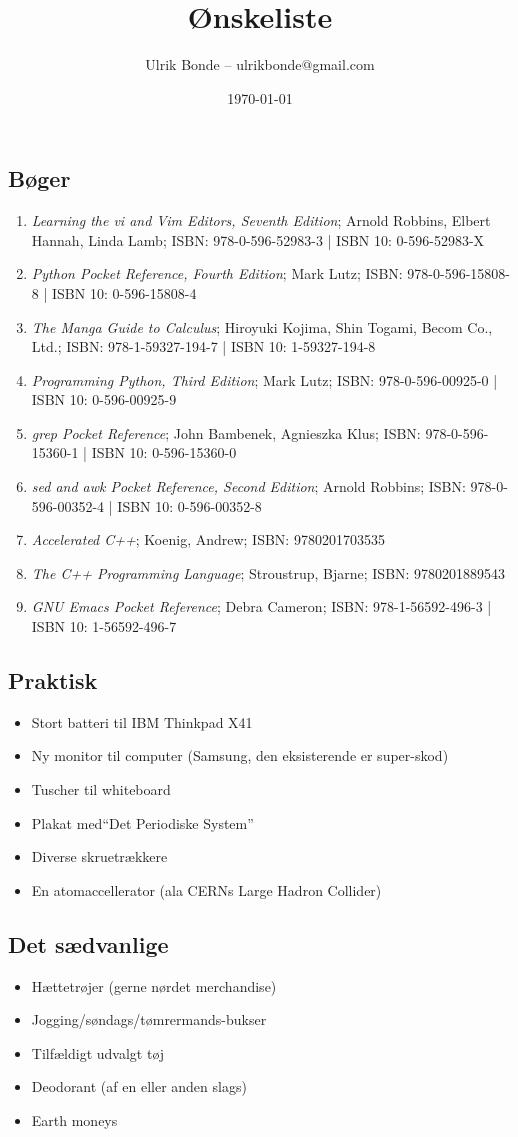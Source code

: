 \documentclass[a4paper, danish, 10pt, final]{article}
\title{Ønskeliste}
\author{Ulrik Bonde -- ulrikbonde@gmail.com}
\date{\today}
\begin{document}
\maketitle
\subsection*{Bøger}
\begin{enumerate}
    \item \emph{Learning the vi and Vim Editors, Seventh Edition}; Arnold Robbins, Elbert Hannah, Linda Lamb; ISBN: 978-0-596-52983-3 | ISBN 10: 0-596-52983-X
    \item \emph{Python Pocket Reference, Fourth Edition}; Mark Lutz; ISBN: 978-0-596-15808-8 | ISBN 10: 0-596-15808-4
    \item \emph{The Manga Guide to Calculus}; Hiroyuki Kojima, Shin Togami, Becom Co., Ltd.; ISBN: 978-1-59327-194-7 | ISBN 10: 1-59327-194-8
    \item \emph{Programming Python, Third Edition}; Mark Lutz; ISBN: 978-0-596-00925-0 | ISBN 10: 0-596-00925-9
    \item \emph{grep Pocket Reference}; John Bambenek, Agnieszka Klus; ISBN: 978-0-596-15360-1 | ISBN 10: 0-596-15360-0
    \item \emph{sed and awk Pocket Reference, Second Edition}; Arnold Robbins; ISBN: 978-0-596-00352-4 | ISBN 10: 0-596-00352-8
    \item \emph{Accelerated C++}; Koenig, Andrew; ISBN: 9780201703535
    \item \emph{The C++ Programming Language}; Stroustrup, Bjarne; ISBN: 9780201889543
    \item \emph{GNU Emacs Pocket Reference}; Debra Cameron; ISBN: 978-1-56592-496-3 | ISBN 10: 1-56592-496-7
\end{enumerate}

\subsection*{Praktisk}
\begin{itemize}
    \item Stort batteri til IBM Thinkpad X41
    \item Ny monitor til computer (Samsung, den eksisterende er super-skod)
    \item Tuscher til whiteboard
    \item Plakat med``Det Periodiske System''
    \item Diverse skruetrækkere
    \item En atomaccellerator (ala CERNs Large Hadron Collider)
\end{itemize}

\subsection*{Det sædvanlige}
\begin{itemize}
    \item Hættetrøjer (gerne nørdet merchandise)
    \item Jogging/søndags/tømrermands-bukser
    \item Tilfældigt udvalgt tøj
    \item Deodorant (af en eller anden slags)
    \item Earth moneys
\end{itemize}
\end{document}

